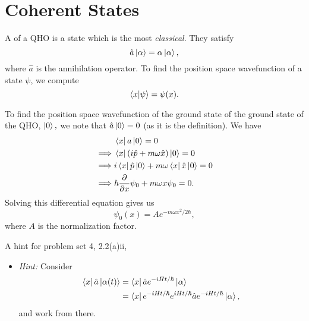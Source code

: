 \documentclass{article}
\numberwithin{equation}{section}
\begin{document}
\section{Coherent States}
A  of a QHO is a state which is the most \textit{classical}. They satisfy 
\begin{equation*}
    \hat{a}\ket{\alpha} = \alpha\ket{\alpha},
\end{equation*}
where $\hat{a}$ is the annihilation operator. To find the position space wavefunction of a state $\psi$, we compute
\begin{equation*}
    \bra{x}\ket{\psi}=\psi(x).
\end{equation*}
\begin{example}
    To find the position space wavefunction of the ground state of the ground state of the QHO, $\ket{0},$ we note that $\hat{a}\ket{0} = 0$ (as it is the definition). We have 
    \begin{align*}
        & \bra{x}a\ket{0}=0\\ 
        \implies & \bra{x}(i\hat{p}+m\omega \hat{x})\ket{0} = 0 \\ 
        \implies & i\bra{x}\hat{p}\ket{0} + m\omega\bra{x}\hat{x}\ket{0} = 0 \\
        \implies & \hbar \frac{\partial}{\partial x}\psi_0 + m\omega x\psi_0 = 0.
    \end{align*}
    Solving this differential equation gives us 
    \begin{equation*}
        \psi_0(x) = Ae^{-m\omega x^2/2\hbar},
    \end{equation*}
    where $A$ is the normalization factor.
\end{example}
A hint for problem set 4, 2.2(a)ii,
\begin{itemize}
    \item \textit{Hint:} Consider
    \begin{align*}
        \bra{x}\hat{a}\ket{\alpha(t)}&=\bra{x}\hat{a}e^{-iHt/\hbar}\ket{\alpha} \\ 
        &= \bra{x}e^{-iHt/\hbar}e^{iHt/\hbar}\hat{a}e^{-iHt/\hbar}\ket{\alpha},
    \end{align*}
    and work from there.
\end{itemize}
\end{document}

